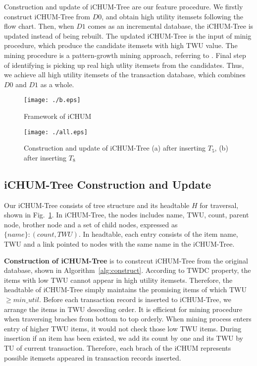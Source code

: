 \documentclass[runningheads,a4paper]{llncs}
\begin{document}
Construction and update of iCHUM-Tree are our feature procedure. We firstly construct iCHUM-Tree from $ D0 $, and obtain high utility itemsets following the flow chart. Then, when $ D1 $ comes as an incremental database, the iCHUM-Tree is updated instead of being rebuilt. The updated iCHUM-Tree is the input of minig procedure, which produce the candidate itemsets with high TWU value. The mining procedure is a pattern-growth mining approach, referring to \cite{Ahmed:IHUP}. Final step of identifying is picking up real high utlity itemsets from the candidates. Thus, we achieve all high utility itemsets of the transaction database, which combines $ D0 $ and $ D1 $ as a whole.

\begin{figure}
\centering
\begin{minipage}[b]{0.4\textwidth}
\centering
\texttt{[image: ./b.eps]}
\caption{Framework of iCHUM}
\label{fig:framework}
\end{minipage}
\begin{minipage}[b]{0.56\textwidth}
\centering
\texttt{[image: ./all.eps]}
\caption{Construction and update of iCHUM-Tree (a) after inserting $ T_{5} $, (b) after inserting $ T_{8} $}
\label{fig:tree}
\end{minipage}
\end{figure}

\subsection{iCHUM-Tree Construction and Update}
Our iCHUM-Tree consists of tree structure and its headtable $ H $ for traversal, shown in Fig.~\ref{fig:tree}. In iCHUM-Tree, the nodes includes name, TWU, count, parent node, brother node and a set of child nodes, expressed as $ \{ name\}:(count, TWU) $. In headtable, each entry consists of the item name, TWU and a link pointed to nodes with the same name in the iCHUM-Tree. 

\textbf{Construction of iCHUM-Tree} is to constrcut iCHUM-Tree from the original database, shown in Algorithm~\ref{alg:construct}. According to TWDC property, the items with low TWU cannot appear in high utility itemsets. Therefore, the headtable of iCHUM-Tree simply maintains the promising items of which TWU $ \ge min\_util $. Before each transaction record is inserted to iCHUM-Tree, we arrange the items in TWU desceding order. It is efficient for mining procedure when traversing braches from bottom to top orderly. When mining process enters entry of higher TWU items, it would not check those low TWU items. During insertion if an item has been existed, we add its count by one and its TWU by TU of current transaction. Therefore, each brach of the iCHUM represents possible itemsets appeared in transaction records inserted.
\end{document}
